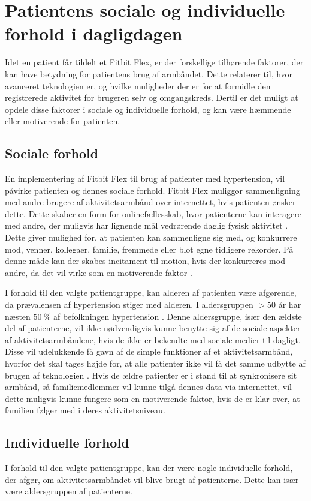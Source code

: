 \section{Patientens sociale og individuelle forhold i dagligdagen}
Idet en patient får tildelt et Fitbit Flex, er der forskellige tilhørende faktorer, der kan have betydning for patientens brug af armbåndet. 
Dette relaterer til, hvor avanceret teknologien er, og hvilke muligheder der er for at formidle den registrerede aktivitet for brugeren selv og omgangskreds. Dertil er det muligt at opdele disse faktorer i sociale og individuelle forhold, og kan være hæmmende eller motiverende for patienten.   

\subsection{Sociale forhold}
En implementering af Fitbit Flex til brug af patienter med hypertension, vil påvirke patienten og dennes sociale forhold. Fitbit Flex muliggør sammenligning med andre brugere af aktivitetsarmbånd over internettet, hvis patienten ønsker dette. Dette skaber en form for onlinefællesskab, hvor patienterne kan interagere med andre, der muligvis har lignende mål vedrørende daglig fysisk aktivitet \citep{karapanos2016}. 
Dette giver mulighed for, at patienten kan sammenligne sig med, og konkurrere mod, venner, kollegaer, familie, fremmede eller blot egne tidligere rekorder. På denne måde kan der skabes incitament til motion, hvis der konkurreres mod andre, da det vil virke som en motiverende faktor \citep{rooksby2014}.

I forhold til den valgte patientgruppe, kan alderen af patienten være afgørende, da prævalensen af hypertension stiger med alderen. I aldersgruppen $>50$ år har næsten $50~\%$ af befolkningen hypertension \citep{kronborg2008}. Denne aldersgruppe, især den ældste del af patienterne, vil ikke nødvendigvis kunne benytte sig af de sociale aspekter af aktivitetsarmbåndene, hvis de ikke er bekendte med sociale medier til dagligt. Disse vil udelukkende få gavn af de simple funktioner af et aktivitetsarmbånd, hvorfor det skal tages højde for, at alle patienter ikke vil få det samme udbytte af brugen af teknologien \citep{mercer2016}. Hvis de ældre patienter er i stand til at synkronisere sit armbånd, så familiemedlemmer vil kunne tilgå dennes data via internettet, vil dette muligvis kunne fungere som en motiverende faktor, hvis de er klar over, at familien følger med i deres aktivitetsniveau.

\subsection{Individuelle forhold}
I forhold til den valgte patientgruppe, kan der være nogle individuelle forhold, der afgør, om aktivitetsarmbåndet vil blive brugt af patienterne. Dette kan især være aldersgruppen af patienterne. 

